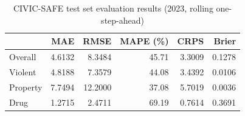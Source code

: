 \begin{table}[htbp]
  \centering
  \caption{CIVIC-SAFE test set evaluation results (2023, rolling one-step-ahead)}
  \label{tab:test_results}
  \begin{tabular}{l r r r r r}
    \toprule
    & \textbf{MAE} & \textbf{RMSE} & \textbf{MAPE (\%)} & \textbf{CRPS} & \textbf{Brier} \\
    \midrule
    Overall & 4.6132 & 8.3484 & 45.71 & 3.3009 & 0.1278 \\
    \midrule
    Violent & 4.8188 & 7.3579 & 44.08 & 3.4392 & 0.0106 \\
    Property & 7.7494 & 12.2000 & 37.08 & 5.7019 & 0.0036 \\
    Drug & 1.2715 & 2.4711 & 69.19 & 0.7614 & 0.3691 \\
    \bottomrule
  \end{tabular}
\end{table}